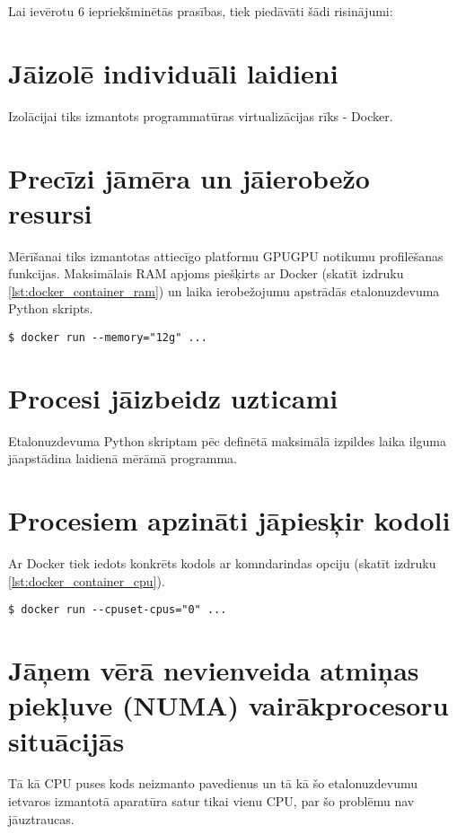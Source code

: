 Lai ievērotu 6 iepriekšminētās prasības, tiek piedāvāti šādi risinājumi:

\section{Jāizolē individuāli laidieni}
Izolācijai tiks izmantots programmatūras virtualizācijas rīks - Docker.
\cite{docker-docs-engine}

\section{Precīzi jāmēra un jāierobežo resursi}
Mērīšanai tiks izmantotas attiecīgo platformu GPUGPU notikumu profilēšanas
funkcijas. Maksimālais RAM apjoms piešķirts ar Docker (skatīt izdruku
\ref{lst:docker_container_ram}) un laika ierobežojumu apstrādās etalonuzdevuma
Python skripts.
\begin{lstlisting}[caption={Docker konteinera palaišana, piešķirot tam konkrēti
    12GiB RAM}, label=lst:docker_container_ram]
$ docker run --memory="12g" ...
\end{lstlisting}

\section{Procesi jāizbeidz uzticami}
Etalonuzdevuma Python skriptam pēc definētā maksimālā izpildes laika ilguma
jāapstādina laidienā mērāmā programma.

\section{Procesiem apzināti jāpiesķir kodoli}
Ar Docker tiek iedots konkrēts kodols ar komndarindas opciju (skatīt izdruku
\ref{lst:docker_container_cpu}).
\begin{lstlisting}[caption={Docker konteinera palaišana, piešķirot tam konkrēti
    pirmo CPU kodolu}, label=lst:docker_container_cpu]
$ docker run --cpuset-cpus="0" ...
\end{lstlisting}

\section{Jāņem vērā nevienveida atmiņas piekļuve (NUMA) vairākprocesoru situācijās}
Tā kā CPU puses kods neizmanto pavedienus un tā kā šo etalonuzdevumu ietvaros
izmantotā aparatūra satur tikai vienu CPU, par šo problēmu nav jāuztraucas.


